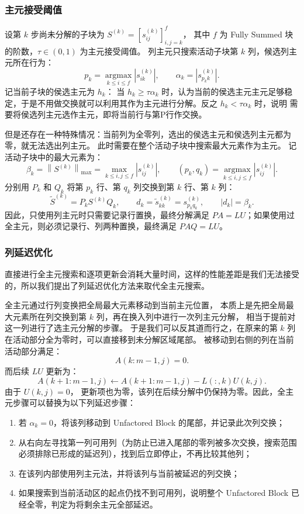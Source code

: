 \subsubsection{主元接受阈值}
设第 $k$ 步尚未分解的子块为
$S^{(k)}=\left[s_{ij}^{(k)}\right]_{i,j=k}^{f}$，
其中 $f$ 为 Fully Summed 块的阶数，$\tau\in(0,1)$ 为主元接受阈值。
列主元只搜索活动子块第 $k$ 列，候选列主元所在行为：
$$p_k=\underset{k\le i\le f}{\operatorname{argmax}}
      \left|s_{ik}^{(k)}\right|,
\qquad
\alpha_k=\left|s_{p_k k}^{(k)}\right|.$$
\qquad 记当前子块的侯选主元为 $h_k$：
当
$h_k\ge\tau\alpha_k$
时，认为当前的侯选主元主元足够稳定，于是不用做交换就可以利用其作为主元进行分解。反之 $h_k<\tau\alpha_k$ 时，说明
需要将侯选列主元选作主元，即将当前行与第P行作交换。

但是还存在一种特殊情况：当前列为全零列，选出的侯选主元和侯选列主元都为零，就无法选出列主元。
此时需要在整个活动子块中搜索最大元素作为主元。
记活动子块中的最大元素为：
$$\beta_k=\left\|S^{(k)}\right\|_{\max}
=\max_{k\le i,j\le f}\left|s_{ij}^{(k)}\right|,\qquad
(p_k,q_k)=\underset{k\le i,j\le f}{\operatorname{argmax}}
           \left|s_{ij}^{(k)}\right|.
$$
分别用 $P_k$ 和 $Q_k$ 将第 $p_k$ 行、第 $q_k$ 列交换到第 $k$ 行、第 $k$ 列：
$$\widetilde S^{(k)}=P_kS^{(k)}Q_k,
\qquad
d_k=\widetilde s_{kk}^{(k)}=s_{p_kq_k}^{(k)},
\qquad
|d_k|=\beta_k.$$
因此，只使用列主元时只需要记录行置换，最终分解满足 $PA=LU$；如果使用过全主元，则必须记录行、列两种置换，最终满足
$PAQ=LU$。

\subsubsection{列延迟优化}
直接进行全主元搜索和逐项更新会消耗大量时间，这样的性能差距是我们无法接受的，所以我们提出了列延迟优化方法来取代全主元搜索。

全主元通过行列变换把全局最大元素移动到当前主元位置，
本质上是先把全局最大元素所在列交换到第 $k$ 列，再在换入列中进行一次列主元分解，
相当于提前对这一列进行了选主元分解的步骤。
于是我们可以反其道而行之，在原来的第 $k$ 列在活动部分全为零时，可以直接移到未分解区域尾部。
被移动到右侧的列在当前活动部分满足：
$$A(k:m-1,j)=0.$$
而后续 $LU$ 更新为：
$$A(k+1:m-1,j)
\leftarrow
A(k+1:m-1,j)-L(:,k)U(k,j).$$
由于
$U(k,j)=0$，
更新项也为零，该列在后续分解中仍保持为零。因此，全主元步骤可以替换为以下列延迟步骤：

\begin{enumerate}
  \item 若 $\alpha_k=0$，将该列移动到 Unfactored Block 的尾部，并记录此次列交换；
  \item 从右向左寻找第一列可用列（为防止已进入尾部的零列被多次交换，搜索范围必须排除已形成的延迟列），找到后立即停止，不再比较其他列；
  \item 在该列内部使用列主元法，并将该列与当前被延迟的列交换；
  \item 如果搜索到当前活动区的起点仍找不到可用列，说明整个 Unfactored Block 已经全零，判定为将剩余主元全部延迟。
\end{enumerate}
